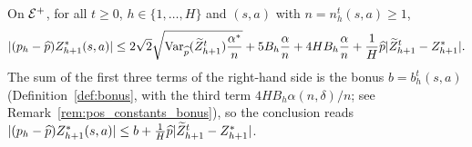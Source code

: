 \begin{lemma}\label{lem:concentration_pos}
\leanok
{}
On $\mathcal{E}^+$, for all $t \ge 0$, $h \in \{1, \dots, H\}$ and $(s,a)$ with $n = n_h^t(s,a) \ge 1$,
\[
  \lvert (p_h - \widehat{p}) Z^*_{h+1}(s,a) \rvert
  \le 2\sqrt2 \sqrt{\operatorname{Var}_{\widehat{p}}(\widetilde{Z}^t_{h+1}) \frac{\alpha^*}{n}}
  + 5 B_h \frac{\alpha}{n} + 4 H B_h \frac{\alpha}{n}
  + \frac1H \widehat{p} \lvert \widetilde{Z}^t_{h+1} - Z^*_{h+1} \rvert .
\]
The sum of the first three terms of the right-hand side is the bonus $b = b_h^t(s,a)$
(Definition~\ref{def:bonus}, with the third term $4 H B_h \alpha(n,\delta)/n$; see
Remark~\ref{rem:pos_constants_bonus}), so the conclusion reads
$\lvert (p_h - \widehat{p}) Z^*_{h+1}(s,a) \rvert \le b + \frac1H \widehat{p}\lvert \widetilde{Z}^t_{h+1} - Z^*_{h+1} \rvert$.
\end{lemma}

